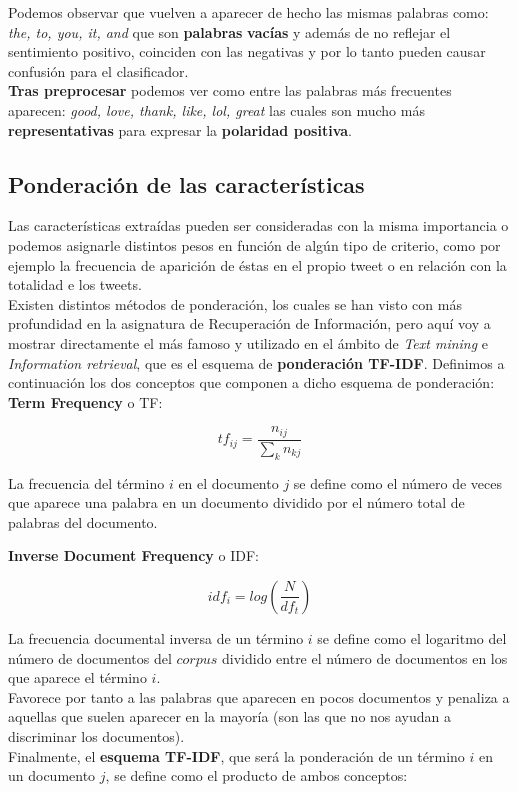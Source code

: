 \documentclass[a4paper,12pt]{report}
\begin{document}
{\setlength{\parindent}{0cm}
Podemos observar que vuelven a aparecer de hecho las mismas palabras como: \textit{the, to, you, it, and} que son \textbf{palabras} \textbf{vacías} y además de no reflejar el sentimiento positivo, coinciden con las negativas y por lo tanto pueden causar confusión para el clasificador. }
\vspace{2mm}\\
\textbf{Tras preprocesar} podemos ver como entre las palabras más frecuentes aparecen: \textit{good, love, thank, like, lol, great} las cuales son mucho más \textbf{representativas} para expresar la \textbf{polaridad positiva}.


\subsection{Ponderación de las características}

{\setlength{\parindent}{0cm}
Las características extraídas pueden ser consideradas con la misma importancia o podemos asignarle distintos pesos en función de algún tipo de criterio, como por ejemplo la frecuencia de aparición de éstas en el propio tweet o en relación con la totalidad e los tweets.\vspace{2mm}\\
Existen distintos métodos de ponderación, los cuales se han visto con más profundidad en la asignatura de Recuperación de Información, pero aquí voy a mostrar directamente el más famoso y utilizado en el ámbito de \textit{Text mining} e \textit{Information retrieval}, que es el esquema de \textbf{ponderación TF-IDF}. Definimos a continuación los dos conceptos que componen a dicho esquema de ponderación: }
\vspace{2mm}\\
\textbf{Term Frequency} o TF:

\[ tf_{ij} = \frac{n_{ij}}{\sum_{k} n_{kj}}  \]

{\setlength{\parindent}{0cm}
La frecuencia del término $i$ en el documento $j$ se define como el número de veces que aparece una palabra en un documento dividido por el número total de palabras del documento. }

\vspace{4mm}
\textbf{Inverse Document Frequency} o IDF:

\[ idf_i = log \left( \frac{N}{df_t} \right) \]

{\setlength{\parindent}{0cm}
La frecuencia documental inversa de un término $i$ se define como el logaritmo del número de documentos del $corpus$ dividido entre el número de documentos en los que aparece el término $i$.} \vspace{2mm}\\
Favorece por tanto a las palabras que aparecen en pocos documentos y penaliza a aquellas que suelen aparecer en la mayoría (son las que no nos ayudan a discriminar los documentos). 
\vspace{4mm}\\
Finalmente, el \textbf{esquema TF-IDF}, que será la ponderación de un término $i$ en un documento $j$, se define como el producto de ambos conceptos:
\end{document}
